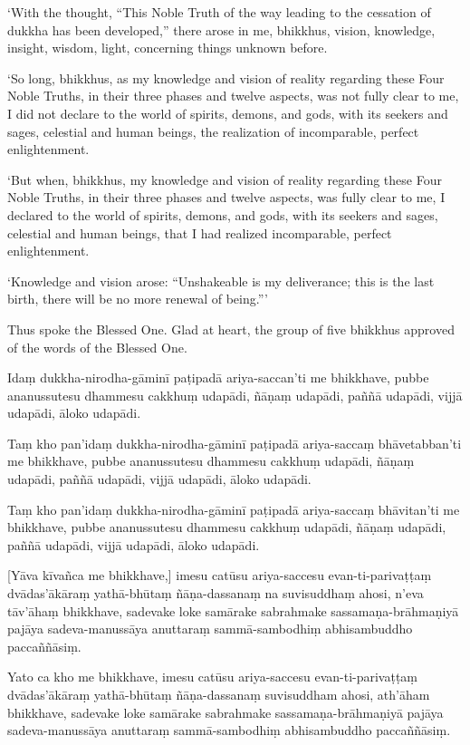 ‘With the thought, “This Noble Truth of the way leading to the cessation
of dukkha has been developed,” there arose in me, bhikkhus, vision,
knowledge, insight, wisdom, light, concerning things unknown before.

‘So long, bhikkhus, as my knowledge and vision of reality regarding
these Four Noble Truths, in their three phases and twelve aspects, was
not fully clear to me, I did not declare to the world of spirits,
demons, and gods, with its seekers and sages, celestial and human
beings, the realization of incomparable, perfect enlightenment.

‘But when, bhikkhus, my knowledge and vision of reality regarding these
Four Noble Truths, in their three phases and twelve aspects, was fully
clear to me, I declared to the world of spirits, demons, and gods, with
its seekers and sages, celestial and human beings, that I had realized
incomparable, perfect enlightenment.

‘Knowledge and vision arose: “Unshakeable is my deliverance; this is
the last birth, there will be no more renewal of being.”\thinspace ’

Thus spoke the Blessed One. Glad at heart, the group of five bhikkhus
approved of the words of the Blessed One.

\clearpage

\paliText
\markboth{\paliTitle}{\rightmark}

Idaṃ dukkha-nirodha-gāminī paṭipadā ariya-saccan'ti me bhikkhave, pubbe
ananussutesu dhammesu cakkhuṃ udapādi, ñāṇaṃ udapādi, paññā udapādi,
vijjā udapādi, āloko udapādi.

Taṃ kho pan'idaṃ dukkha-nirodha-gāminī paṭipadā ariya-saccaṃ bhāvetabban'ti
me bhikkhave, pubbe ananussutesu dhammesu cakkhuṃ udapādi, ñāṇaṃ
udapādi, paññā udapādi, vijjā udapādi, āloko udapādi.

Taṃ kho pan'idaṃ dukkha-nirodha-gāminī paṭipadā ariya-saccaṃ bhāvitan'ti me
bhikkhave, pubbe ananussutesu dhammesu cakkhuṃ udapādi, ñāṇaṃ udapādi,
paññā udapādi, vijjā udapādi, āloko udapādi.

[Yāva kīvañca me bhikkhave,] imesu catūsu ariya-saccesu evan-ti-parivaṭṭaṃ
dvādas'ākāraṃ yathā-bhūtaṃ ñāṇa-dassanaṃ na suvisuddhaṃ ahosi, n'eva tāv'āhaṃ
bhikkhave, sadevake loke samārake sabrahmake sassamaṇa-brāhmaṇiyā pajāya
sadeva-manussāya anuttaraṃ sammā-sambodhiṃ abhisambuddho paccaññāsiṃ.

Yato ca kho me bhikkhave, imesu catūsu ariya-saccesu evan-ti-parivaṭṭaṃ
dvādas'ākāraṃ yathā-bhūtaṃ ñāṇa-dassanaṃ suvisuddham ahosi, ath'āham
bhikkhave, sadevake loke samārake sabrahmake sassamaṇa-brāhmaṇiyā pajāya
sadeva-manussāya anuttaraṃ sammā-sambodhiṃ abhisambuddho paccaññāsiṃ.

